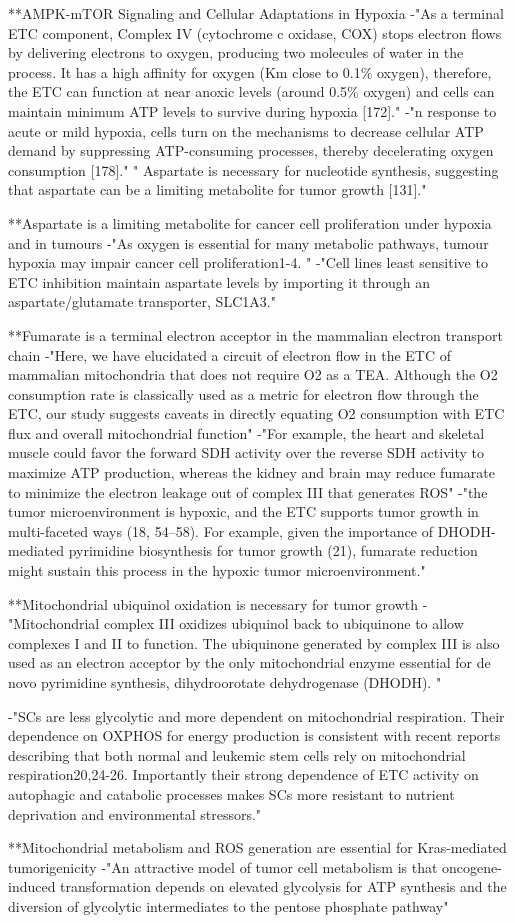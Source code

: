 \documentclass[11pt,a4paper]{article}
\begin{document}
**AMPK-mTOR Signaling and Cellular Adaptations in Hypoxia
-"As a terminal ETC component, Complex IV (cytochrome c oxidase, COX) stops electron flows by delivering electrons to oxygen, producing two molecules of water in the process. It has a high affinity for oxygen (Km close to 0.1\% oxygen), therefore, the ETC can function at near anoxic levels (around 0.5\% oxygen) and cells can maintain minimum ATP levels to survive during hypoxia [172]."
-"n response to acute or mild hypoxia, cells turn on the mechanisms to decrease cellular ATP demand by suppressing ATP-consuming processes, thereby decelerating oxygen consumption [178]."
" Aspartate is necessary for nucleotide synthesis, suggesting that aspartate can be a limiting metabolite for tumor growth [131]."

**Aspartate is a limiting metabolite for cancer cell proliferation under hypoxia and in tumours 
-"As oxygen is essential for many metabolic pathways, tumour hypoxia may impair cancer cell proliferation1-4. "
-"Cell lines least sensitive to ETC inhibition maintain aspartate levels by importing it through an aspartate/glutamate transporter, SLC1A3."

**Fumarate is a terminal electron acceptor in the mammalian electron transport chain
-"Here, we have elucidated a circuit of electron flow in the ETC of mammalian mitochondria that does not require O2 as a TEA. Although the O2 consumption rate is classically used as a metric for electron flow through the ETC, our study suggests caveats in directly equating O2 consumption with ETC flux and overall mitochondrial function"
-"For example, the heart and skeletal muscle could favor the forward SDH activity over the reverse SDH activity to maximize ATP production, whereas the kidney and brain may reduce fumarate to minimize the electron leakage out of complex III that generates ROS"
-"the tumor microenvironment is hypoxic, and the ETC supports tumor growth in multi-faceted ways (18, 54–58). For example, given the importance of DHODH-mediated pyrimidine biosynthesis for tumor growth (21), fumarate reduction might sustain this process in the hypoxic tumor microenvironment."

**Mitochondrial ubiquinol oxidation is necessary for tumor growth
-"Mitochondrial complex III oxidizes ubiquinol back to ubiquinone to allow complexes I and II to function. The ubiquinone generated by complex III is also used as an electron acceptor by the only mitochondrial enzyme essential for de novo pyrimidine synthesis, dihydroorotate dehydrogenase (DHODH). "

-"SCs are less glycolytic and more dependent on mitochondrial respiration. Their dependence on OXPHOS for energy production is consistent with recent reports describing that both normal and leukemic stem cells rely on mitochondrial respiration20,24-26. Importantly their strong dependence of ETC activity on autophagic and catabolic processes makes SCs more resistant to nutrient deprivation and environmental stressors."

**Mitochondrial metabolism and ROS generation are essential for Kras-mediated tumorigenicity
-"An attractive model of tumor cell metabolism is that oncogene-induced transformation depends on elevated glycolysis for ATP synthesis and the diversion of glycolytic intermediates to the pentose phosphate pathway"
\end{document}
